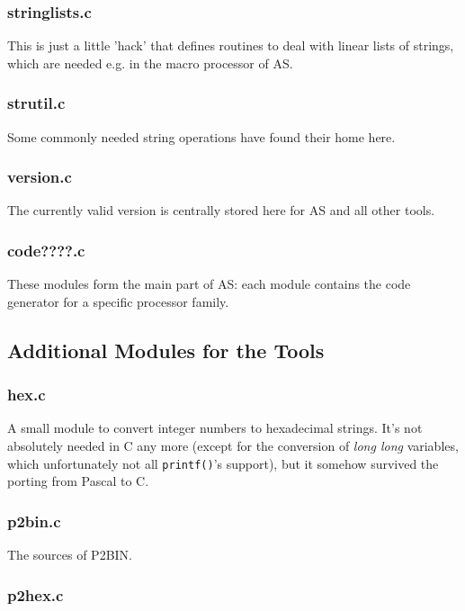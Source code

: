 \documentclass[12pt,twoside]{report}
\newcommand{\asname}{{AS}}
\begin{document}
\subsubsection{stringlists.c}

This is just a little 'hack' that defines routines to deal with linear
lists of strings, which are needed e.g. in the macro processor of \asname{}.

\subsubsection{strutil.c}

Some commonly needed string operations have found their home here.

\subsubsection{version.c}

The currently valid version is centrally stored here for \asname{} and all other
tools.

\subsubsection{code????.c}

These modules form the main part of \asname{}: each module contains the code
generator for a specific processor family.

\subsection{Additional Modules for the Tools}

\subsubsection{hex.c}

A small module to convert integer numbers to hexadecimal strings.  It's
not absolutely needed in C any more (except for the conversion of {\em
long long} variables, which unfortunately not all {\tt printf()}'s
support), but it somehow survived the porting from Pascal to C.

\subsubsection{p2bin.c}

The sources of P2BIN.

\subsubsection{p2hex.c}
\end{document}
